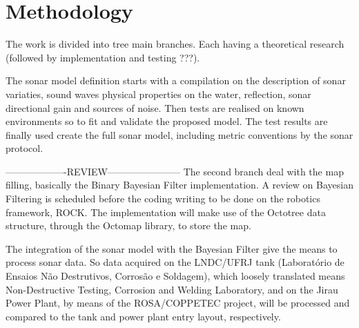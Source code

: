 

\section{Methodology}
 


% 


The work is divided into tree main branches. Each having a theoretical research
(followed by implementation and testing ???).

The sonar model definition starts with a compilation on the description of sonar
variaties, sound waves physical properties on the water, reflection, sonar
directional gain and sources of noise. Then tests are realised on known
environments so to fit and validate the proposed model. The test results are
finally used create the full sonar model, including metric conventions by the
sonar protocol.


-------------------REVIEW-----------------------
The second branch deal with the map filling, basically the Binary Bayesian
Filter implementation. A review on Bayesian Filtering is scheduled before the
coding writing to be done on the robotics framework, ROCK. The implementation
will make use of the Octotree data structure, through the Octomap library, to
store the map.

The integration of the sonar model with the Bayesian Filter give the means to
process sonar data. So data acquired on the LNDC/UFRJ tank (Laboratório de
Ensaios Não Destrutivos, Corrosão e Soldagem), which loosely translated means
Non-Destructive Testing, Corrosion and Welding Laboratory, and on the Jirau
Power Plant, by means of the ROSA/COPPETEC project, will be processed and
compared to the tank and power plant entry layout, respectively.
 

